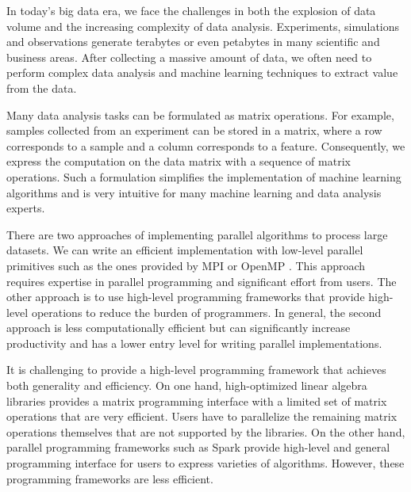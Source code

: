 
In today's big data era, we face the challenges in both the explosion of
data volume and the increasing complexity of data analysis. Experiments,
simulations and observations generate terabytes or
even petabytes in many scientific and business areas. After collecting
a massive amount of data, we often need to perform complex data analysis
and machine learning techniques to extract value from the data.

Many data analysis tasks can be formulated as matrix operations. For example,
samples collected from an experiment can be stored in a matrix, where a row
corresponds to a sample and a column corresponds to a feature.
Consequently, we express the computation on the data matrix with a sequence
of matrix operations. Such a formulation simplifies the implementation of
machine learning algorithms and is very intuitive for many machine learning
and data analysis experts.


There are two approaches of implementing parallel algorithms to process large
datasets. We can write an efficient implementation with low-level parallel
primitives such as the ones provided by MPI \cite{mpi} or OpenMP \cite{openmp}.
This approach requires expertise in parallel programming and significant
effort from users. The other approach is to use high-level programming
frameworks that provide high-level operations to reduce the burden of
programmers. In general, the second approach is less computationally
efficient but can significantly increase productivity and has a lower
entry level for writing parallel implementations.


It is challenging to provide a high-level programming framework
that achieves both generality and efficiency. On one hand, high-optimized
linear algebra libraries \cite{mkl, openblas, elemental, trilinos, petsc}
provides a matrix programming interface with a limited set of matrix operations
that are very efficient. Users have to parallelize the remaining matrix
operations themselves that are not supported by the libraries. On the other hand,
parallel programming frameworks such as Spark \cite{spark} provide high-level
and general programming interface for users to express varieties of algorithms.
However, these programming frameworks are less efficient.

